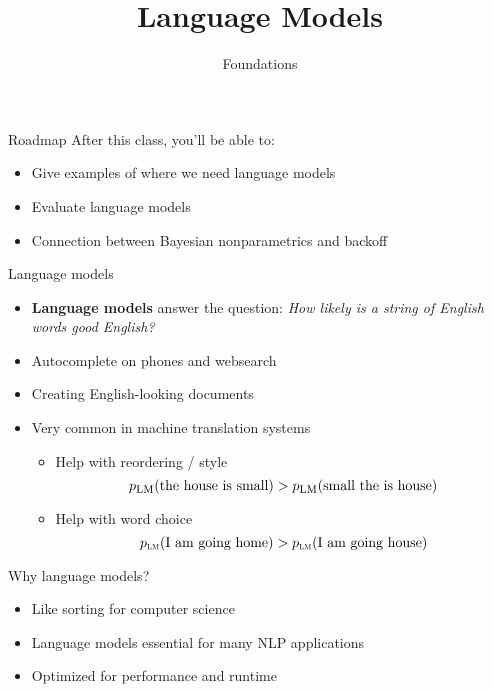 \documentclass[compress]{beamer}
\title{Language Models}
\date{Foundations}
\begin{document}
\frame{\titlepage
}



\begin{frame}{Roadmap}
After this class, you'll be able to:
  \begin{itemize}
    \item Give examples of where we need language models
    \item Evaluate language models
    \item Connection between Bayesian nonparametrics and backoff
  \end{itemize}
\end{frame}


\begin{frame}{Language models}
\begin{itemize}
\item {\bf Language models} answer the question: {\em How likely is a string of English words good English?}
\item Autocomplete on phones and websearch
\item Creating English-looking documents
\item Very common in machine translation systems
\begin{itemize}
\item Help with reordering / style
\begin{equation*}
p_{\mbox{\sc lm}}(\mbox{the house is small}) > p_{\mbox{\sc lm}}(\mbox{small the is house})
\end{equation*}
\item Help with word choice
\begin{equation*}
p_\text{\sc lm}(\mbox{I am going home}) > p_\text{\sc lm}(\mbox{I am going house})
\end{equation*}
\end{itemize}
\end{itemize}

\end{frame}

\begin{frame}{Why language models?}

  \begin{itemize}
    \item Like sorting for computer science
    \item Language models essential for many NLP applications
    \item Optimized for performance and runtime
  \end{itemize}

\end{frame}
\end{document}
